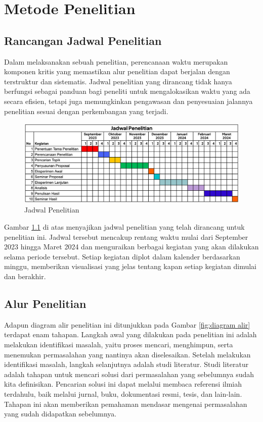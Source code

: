 \chapter{Metode Penelitian}
\section{Rancangan Jadwal Penelitian}
Dalam melaksanakan sebuah penelitian, perencanaan waktu merupakan komponen kritis yang memastikan alur penelitian dapat berjalan dengan terstruktur dan sistematis. Jadwal penelitian yang dirancang tidak hanya berfungsi sebagai panduan bagi peneliti untuk mengalokasikan waktu yang ada secara efisien, tetapi juga memungkinkan pengawasan dan penyesuaian jalannya penelitian sesuai dengan perkembangan yang terjadi.

\begin{figure}[h!]
    \centering
    \includegraphics[width=1\textwidth]{figures/ch03/Timeline.png}
    \caption{Jadwal Penelitian}
    \label{fig:jadwal-penelitian}
\end{figure}

Gambar \ref{fig:jadwal-penelitian} di atas menyajikan jadwal penelitian yang telah dirancang untuk penelitian ini. Jadwal tersebut mencakup rentang waktu mulai dari September 2023 hingga Maret 2024 dan menguraikan berbagai kegiatan yang akan dilakukan selama periode tersebut. Setiap kegiatan diplot dalam kalender berdasarkan minggu, memberikan visualisasi yang jelas tentang kapan setiap kegiatan dimulai dan berakhir. 

\section{Alur Penelitian}
Adapun diagram alir penelitian ini ditunjukkan pada Gambar \ref{fig:diagram alir} terdapat enam tahapan. Langkah awal yang dilakukan pada penelitian ini adalah melakukan identifikasi masalah, yaitu proses mencari, menghimpun, serta menemukan permasalahan yang nantinya akan diselesaikan. Setelah melakukan identifikasi masalah, langkah selanjutnya adalah studi literatur. Studi literatur adalah tahapan untuk mencari solusi dari permasalahan yang sebelumnya sudah kita definisikan. Pencarian solusi ini dapat melalui membaca referensi ilmiah terdahulu, baik melalui jurnal, buku, dokumentasi resmi, tesis, dan lain-lain. Tahapan ini akan memberikan pemahaman mendasar mengenai permasalahan yang sudah didapatkan sebelumnya. 

